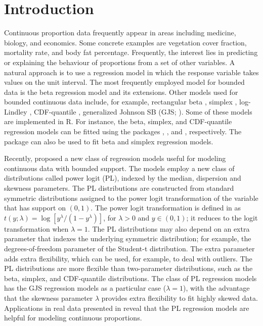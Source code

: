 \section{Introduction}

Continuous proportion data frequently appear in areas including medicine, biology, and economics. Some concrete examples are vegetation cover fraction, mortality rate, and body fat percentage. Frequently, the interest lies in predicting or explaining the behaviour of proportions from a set of other variables. A natural approach is to use a regression model in which the response variable takes values on the unit interval. The most frequently employed model for bounded data is the beta regression model \citep{FerrariCribariNeto2004} and its extensions. Other models used for bounded continuous data include, for example, rectangular beta \citep{BayesBazanGarcia2012}, simplex \citep{BARNDORFFNIELSEN1991106, ZHANGQIU2014}, log-Lindley \citep{GOMEZDENIZ201449}, CDF-quantile \citep{SmithsonShou2017}, generalized Johnson SB (GJS; \cite{LemonteBazan2016}). Some of these models are implemented in R. For instance, the beta, simplex, and CDF-quantile regression models can be fitted using the packages  \citep{Zeileisetal2021},  \citep{ZhangQiuShi2016}, and  \citep{Shou2022}, respectively.  The  \citep{Stasinopoulos+Rigby:2007} package can also be used to fit beta and simplex regression models.

Recently, \cite{QueirozFerrari2023} proposed a new class of regression models useful for modeling continuous data with bounded support. The models employ a new class of distributions called power logit (PL), indexed by the median, dispersion and skewness parameters. The PL distributions are constructed from standard symmetric distributions assigned to the power logit transformation of the variable that has support on $(0, 1)$. The power logit transformation is defined in \cite{QueirozFerrari2023} as $t(y; \lambda) = \log[y^\lambda/(1-y^\lambda)]$, for $\lambda>0$ and $y \in (0,1)$; it reduces to the logit transformation when $\lambda=1$. The PL distributions may also depend on an extra parameter that indexes the underlying symmetric distribution; for example, the degrees-of-freedom parameter of the Student-t distribution. The extra parameter adds extra flexibility, which can be used, for example, to deal with outliers. The PL distributions are more flexible than two-parameter distributions, such as the beta, simplex, and CDF-quantile distributions. The class of PL regression models has the GJS regression models as a particular case ($\lambda=1$), with the advantage that the skewness parameter $\lambda$ provides extra flexibility to fit highly skewed data. Applications in real data presented in \cite{QueirozFerrari2023} reveal that the PL regression models are helpful for modeling continuous proportions. 

